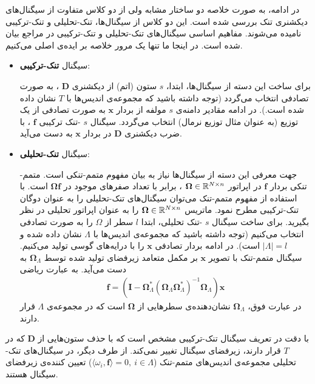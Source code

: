 در ادامه، به صورت خلاصه دو ساختار مشابه ولی از دو کلاس متفاوت از سیگنال‌های دیکشنری تنک بررسی شده است. این دو کلاس از سیگنال‌ها، تنک-تحلیلی
و تنک-ترکیبی
نامیده می‌شوند. مفاهیم اساسی سیگنال‌های تنک-تحلیلی
و  تنک-ترکیبی
در مراجع
\cite{elad2007analysis,Candes2011,nam2013cosparse}
بیان شده است. در اینجا ما تنها یک مرور خلاصه بر ایده‌ی اصلی می‌کنیم.
\begin{itemize}
\item{
سیگنال
\textbf{تنک-ترکیبی}:

برای ساخت این دسته از سیگنال‌ها، ابتدا، 
$s$
ستون (اتم) از دیکشنری 
$\bm{D}$
، به صورت تصادفی انتخاب می‌گردد (توجه داشته باشید که مجموعه‌ی اندیس‌ها با 
$ T $
نشان داده شده است.). در ادامه مقادیر دامنه‌ی 
$ s $
مولفه از بردار
$ \bm{x} $
به صورت تصادفی از یک توزیع (به عنوان مثال توزیع نرمال) انتخاب می‌گردد. سیگنال 
$ s $
-تنک ترکیبی
$ \bm{f} $
، با ضرب دیکشنری 
$\bm{D}$
در بردار 
$ \bm{x} $
به دست می‌آید.
}
\item{
سیگنال
\textbf{تنک-تحلیلی}:

جهت معرفی این دسته از سیگنال‌ها نیاز به بیان مفهوم متمم-تنکی 
است. متمم-تنکی بردار
$ \bm{f} $
در اپراتور
$ \bm{\bm{\Omega}}\in \mathbb{R}^{N\times n} $
،‌ برابر با تعداد صفرهای موجود در
$ \bm{\bm{\Omega}}\bm{f} $
است. با استفاده از مفهوم متمم-تنک می‌توان سیگنال‌های تنک-تحلیلی را به عنوان دوگان تنک-ترکیبی مطرح نمود. ماتریس
$ \bm{\bm{\Omega}}\in \mathbb{R}^{N\times n} $
را به عنوان اپراتور تحلیلی
در نظر بگیرید. برای ساخت سیگنال 
$ s $
-تنک تحلیلی، ابتدا 
$l$
سطر از 
$\Omega$
را به صورت تصادفی انتخاب می‌کنیم (توجه داشته باشید که مجموعه‌ی اندیس‌ها با 
$ \Lambda $
نشان داده شده و
$\vert \Lambda \vert = l$
است). در ادامه بردار تصادفی 
$ \bm{x} $
را با درایه‌‌های
گوسی تولید می‌کنیم. سیگنال متمم-تنک با تصویر
$ \bm{x} $
بر مکمل متعامد زیرفضای تولید شده توسط 
$ \bm{\bm{\Omega}}_{\Lambda} $
به دست می‌آید. به عبارت ریاضی
\begin{align}
\label{eq:eq26}
\bm{f}= (\bm{I}-\bm{\Omega}^{\ast}_{\Lambda}(\bm{\Omega}_{\Lambda}\bm{\Omega}^{\ast}_{\Lambda})^{-1}\bm{\Omega}_{\Lambda})\bm{x}
\end{align}
در عبارت فوق، 
$ \bm{\bm{\Omega}}_{\Lambda} $
نشان‌دهنده‌ی سطرهایی از 
$ \bm{\Omega} $ 
است که در مجموعه‌ی 
$ \Lambda $
قرار دارند.
}
\end{itemize}

با دقت در تعریف سیگنال تنک-ترکیبی مشخص است که با حذف ستون‌هایی از 
$\bm{D}$
که در
$ T $
قرار دارند، زیرفضای سیگنال تغییر نمی‌کند. از طرف دیگر، در سیگنال‌های تنک-تحلیلی
مجموعه‌ی اندیس‌های متمم-تنک
($ \langle \omega_{i}, \bm{f} \rangle =0,~ i \in \Lambda $)
تعیین کننده‌ی زیرفضای سیگنال هستند.

